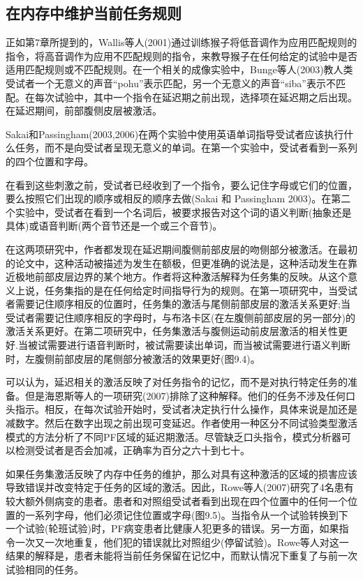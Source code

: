 \subsection{在内存中维护当前任务规则}
\par
正如第7章所提到的，Wallis等人(2001)通过训练猴子将低音调作为应用匹配规则的指令，将高音调作为应用不匹配规则的指令，来教导猴子在任何给定的试验中是否适用匹配规则或不匹配规则。在一个相关的成像实验中，Bunge等人(2003)教人类受试者一个无意义的声音“pohu”表示匹配，另一个无意义的声音“siba”表示不匹配。在每次试验中，其中一个指令在延迟期之前出现，选择项在延迟期之后出现。在延迟期间，前部腹侧皮层被激活。
\par
Sakai和Passingham(2003,2006)在两个实验中使用英语单词指导受试者应该执行什么任务，而不是向受试者呈现无意义的单词。在第一个实验中，受试者看到一系列的四个位置和字母。
\par
在看到这些刺激之前，受试者已经收到了一个指令，要么记住字母或它们的位置，要么按照它们出现的顺序或相反的顺序去做(Sakai 和 Passingham 2003)。在第二个实验中，受试者在看到一个名词后，被要求报告对这个词的语义判断(抽象还是具体)或语音判断(两个音节还是一个或三个音节)。
\par
在这两项研究中，作者都发现在延迟期间腹侧前部皮层的吻侧部分被激活。在最初的论文中，这种活动被描述为发生在额极，但更准确的说法是，这种活动发生在靠近极地前部皮层边界的某个地方。作者将这种激活解释为任务集的反映。从这个意义上说，任务集指的是在任何给定时间指导行为的规则。在第一项研究中，当受试者需要记住顺序相反的位置时，任务集的激活与尾侧前部皮层的激活关系更好;当受试者需要记住顺序相反的字母时，与布洛卡区(在左腹侧前部皮层的另一部分)的激活关系更好。在第二项研究中，任务集激活与腹侧运动前皮层激活的相关性更好.当被试需要进行语音判断时，被试需要读出单词，而当被试需要进行语义判断时，左腹侧前部皮层的尾侧部分被激活的效果更好(图9.4)。
\par
可以认为，延迟相关的激活反映了对任务指令的记忆，而不是对执行特定任务的准备。但是海恩斯等人的一项研究(2007)排除了这种解释。他们的任务不涉及任何口头指示。相反，在每次试验开始时，受试者决定执行什么操作，具体来说是加还是减数字。然后在数字出现之前出现可变延迟。作者使用一种区分不同试验类型激活模式的方法分析了不同PF区域的延迟期激活。尽管缺乏口头指令，模式分析器可以检测受试者是否会加减，正确率为百分之六十到七十。
\par
如果任务集激活反映了内存中任务的维护，那么对具有这种激活的区域的损害应该导致错误并改变特定于任务的区域的激活。因此，Rowe等人(2007)研究了4名患有较大额外侧病变的患者。患者和对照组受试者看到出现在四个位置中的任何一个位置的一系列字母，他们必须记住位置或字母(图9.5)。当指令从一个试验转换到下一个试验(轮班试验)时，PF病变患者比健康人犯更多的错误。另一方面，如果指令一次又一次地重复，他们犯的错误就比对照组少(停留试验)。Rowe等人对这一结果的解释是，患者未能将当前任务保留在记忆中，而默认情况下重复了与前一次试验相同的任务。
